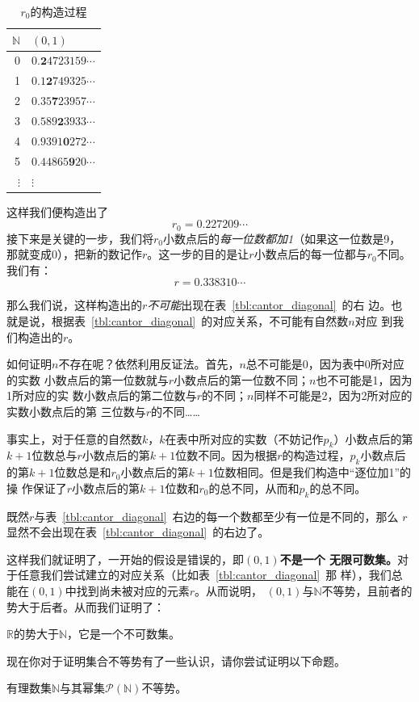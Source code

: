 \begin{table}[h]
    \centering
    \caption{$r_{0}$的构造过程}\label{tbl:cantor_diagonal_maker0}
    \begin{tabular}{r|l}
        $\mathbb{N}$& $\left( 0,1 \right) $\\
        \hline
        0 & $0.\mathbf{2}4723159\cdots $\\
        1 & $0.1\mathbf{2}749325\cdots $\\
        2 & $0.35\mathbf{7}23957\cdots $\\
        3 & $0.589\mathbf{2}3933\cdots $\\
        4 & $0.9391\mathbf{0}272\cdots $\\
        5 & $0.44865\mathbf{9}20\cdots $\\
        $\vdots$ & $\vdots$
    \end{tabular}
\end{table}

这样我们便构造出了
\[
    r_{0}=0.227209\cdots 
\]
接下来是关键的一步，我们将$r_{0}$小数点后的\emph{每一位数都加1}（如果这一位数是9，
那就变成0），把新的数记作$r$。这一步的目的是让$r$小数点后的每一位都与$r_{0}$不同。
我们有：
\[
    r=0.338310\cdots 
\]

那么我们说，这样构造出的$r$\emph{不可能}出现在表~\ref{tbl:cantor_diagonal}~的右
边。也就是说，根据表~\ref{tbl:cantor_diagonal}~的对应关系，不可能有自然数$n$对应
到我们构造出的$r$。

如何证明$n$不存在呢？依然利用反证法。首先，$n$总不可能是0，因为表中0所对应的实数
小数点后的第一位数就与$r$小数点后的第一位数不同；$n$也不可能是1，因为1所对应的实
数小数点后的第二位数与$r$的不同；$n$同样不可能是2，因为2所对应的实数小数点后的第
三位数与$r$的不同……

事实上，对于任意的自然数$k$，$k$在表中所对应的实数（不妨记作$p_k$）小数点后的第
$k+1$位数总与$r$小数点后的第$k+1$位数不同。因为根据$r$的构造过程，$p_k$小数点后
的第$k+1$位数总是和$r_{0}$小数点后的第$k+1$位数相同。但是我们构造中“逐位加1”的操
作保证了$r$小数点后的第$k+1$位数和$r_{0}$的总不同，从而和$p_k$的总不同。

既然$r$与表~\ref{tbl:cantor_diagonal}~右边的每一个数都至少有一位是不同的，那么
$r$显然不会出现在表~\ref{tbl:cantor_diagonal}~的右边了。

这样我们就证明了，一开始的假设是错误的，即\textbf{$\left( 0,1 \right) $不是一个
无限可数集。}对于任意我们尝试建立的对应关系（比如表~\ref{tbl:cantor_diagonal}~那
样），我们总能在$\left( 0,1 \right) $中找到尚未被对应的元素$r$。从而说明，
$\left( 0,1 \right) $与$\mathbb{N}$不等势，且前者的势大于后者。从而我们证明了：

\begin{rawthm}
    $\mathbb{R}$的势大于$\mathbb{N}$，它是一个不可数集。
\end{rawthm}

现在你对于证明集合不等势有了一些认识，请你尝试证明以下命题。

\begin{rawprp}[2024台州二模19题改]
    有理数集$\mathbb{N}$与其幂集$\mathcal{P}(\mathbb{N})$不等势。    
\end{rawprp}


